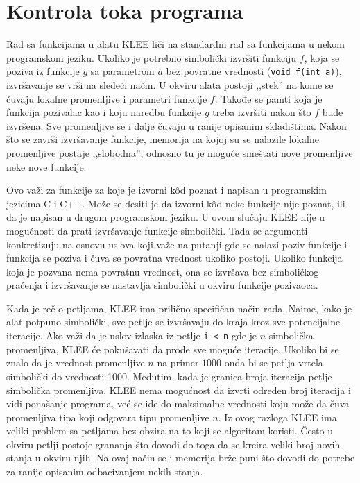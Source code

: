 \documentclass[12pt,oneside]{memoir}
\begin{document}
\section{Kontrola toka programa}
Rad sa funkcijama u alatu KLEE liči na standardni rad sa funkcijama u nekom programskom jeziku. Ukoliko je potrebno simbolički izvršiti funkciju $f$, koja se poziva iz funkcije $g$ sa parametrom $a$ bez povratne vrednosti (\texttt{void f(int a)}), izvršavanje se vrši na sledeći način. U okviru alata postoji ,,stek'' na kome se čuvaju lokalne promenljive i parametri funkcije $f$. Takođe se pamti koja je funkcija pozivalac kao i koju naredbu funkcije $g$ treba izvršiti nakon što $f$ bude izvršena. Sve promenljive se i dalje čuvaju u ranije opisanim skladištima. Nakon što se završi izvršavanje funkcije, memorija na kojoj su se nalazile lokalne promenljive postaje ,,slobodna'', odnosno tu je moguće smeštati nove promenljive neke nove funkcije. 

Ovo važi za funkcije za koje je izvorni k\^od poznat i napisan u programskim jezicima C i C++. Može se desiti je da izvorni k\^od neke funkcije nije poznat, ili da je napisan u drugom programskom jeziku. U ovom slučaju KLEE nije u mogućnosti da prati izvršavanje funkcije simbolički. Tada se argumenti konkretizuju na osnovu uslova koji važe na putanji gde se nalazi poziv funkcije i funkcija se poziva i čuva se povratna vrednost ukoliko postoji. Ukoliko funkcija koja je pozvana nema povratnu vrednost, ona se izvršava bez simboličkog praćenja i izvršavanje se nastavlja simbolički u okviru funkcije pozivaoca. 

\indent Kada je reč o petljama, KLEE ima prilično specifičan način rada. Naime, kako je alat potpuno simbolički, sve petlje se izvršavaju do kraja kroz sve potencijalne iteracije. Ako važi da je uslov izlaska iz petlje \texttt{i < n} gde je $n$ simbolička promenljiva, KLEE će pokušavati da prođe sve moguće iteracije. Ukoliko bi se znalo da je vrednost promenljive $n$ na primer $1000$ onda bi se petlja vrtela simbolički do vrednosti 1000. Međutim, kada je granica broja iteracija petlje simbolička promenljiva, KLEE nema mogućnost da izvrti određen broj iteracija i vidi ponašanje programa, već se ide do maksimalne vrednosti koju može da čuva promenljiva tipa koji odgovara tipu promenljive $n$. Iz ovog razloga KLEE ima veliki problem sa petljama bez obzira na to koji se algoritam koristi. Često u okviru petlji postoje grananja što dovodi do toga da se kreira veliki broj novih stanja u okviru njih. Na ovaj način se i memorija brže puni što dovodi do potrebe za ranije opisanim odbacivanjem nekih stanja. 
\end{document}
